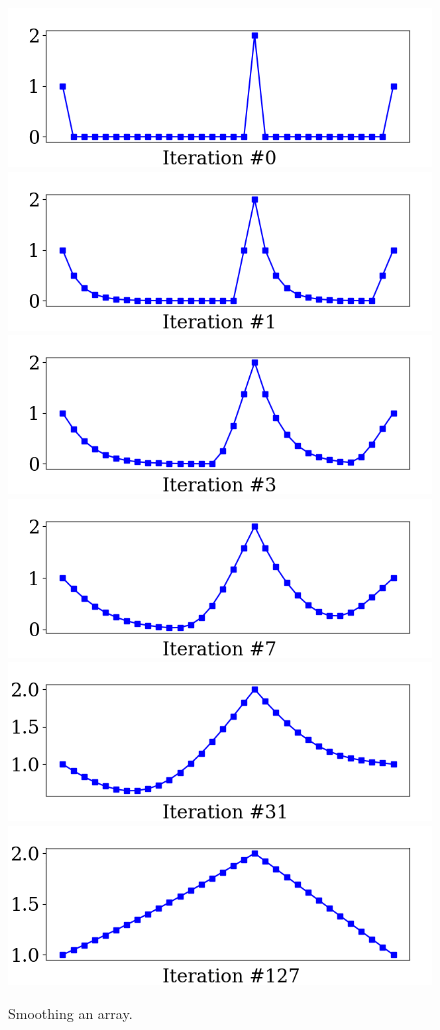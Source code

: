 \documentclass[notitlepage]{report}
\begin{document}
\begin{figure}[ht]
    \centering
    \includegraphics[width=.32\linewidth]{linsys_smooth_constrain0.png}
    \includegraphics[width=.32\linewidth]{linsys_smooth_constrain1.png}
    \includegraphics[width=.32\linewidth]{linsys_smooth_constrain2.png}
    \includegraphics[width=.32\linewidth]{linsys_smooth_constrain3.png}
    \includegraphics[width=.32\linewidth]{linsys_smooth_constrain4.png}
    \includegraphics[width=.32\linewidth]{linsys_smooth_constrain5.png}
    \caption{Smoothing an array.}
    \label{fig:linsys_smooth_constrain}
\end{figure}
\end{document}
